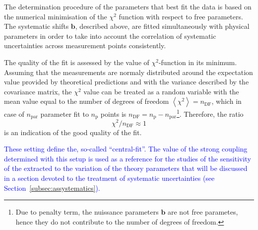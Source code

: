 The determination procedure of the parameters that best fit the data is based on the numerical minimisation of the $\chi^2$ function with respect to free parameters. The systematic shifts $\mathbf{b}$, described above, are fitted simultaneously with physical parameters in order to take into account the correlation of systematic uncertainties across measurement points consistently.

The quality of the fit is assessed by the value of $\chi^2$-function in its minimum. Assuming that the measurements are normaly distributed around the expectation value provided by theoretical predictions and with the variance described by the covariance matrix, the $\chi^2$ value can be treated as a random variable with the mean value equal to the number of degrees of freedom $\left\langle \chi^2 \right\rangle = n_\text{DF}$, which in case of $n_\text{par}$ parameter fit to $n_\text{p}$ points is $n_\text{DF}=n_\text{p}-n_\text{par}$\footnote{Due to penalty term, the nuissance parameters $\mathbf{b}$ are not free parametes, hence they do not contribute to the number of degrees of freedom.}. Therefore, the ratio
\begin{equation}
 \chi^2/n_\text{DF} \approx 1
\end{equation}
is an indication of the good quality of the fit.

\textcolor{blue}{These setting define the, so-called ``central-fit''. The value of the strong coupling determined with this setup is used as a reference for the studies of the sensitivity of the extracted \asz to the variation of the theory parameters that will be discussed in a section devoted to the treatment of systematic uncertainties (see Section~\ref{subsec:assystematics}).}
